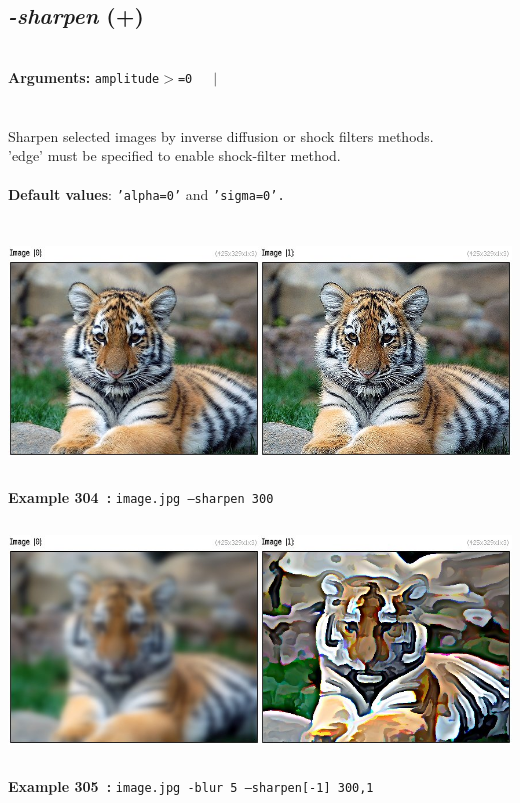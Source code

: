 \documentclass[a4paper,11pt,twoside]{book}
\begin{document}
\subsection{\emph{-sharpen} (+)}\vspace*{-0.5em}
~\\\textbf{Arguments: } 
{\small \texttt{amplitude$>$=0}}~~~$|$\\
\\~\\
Sharpen selected images by inverse diffusion or shock filters methods.
~\\'edge' must be specified to enable shock-filter method.
~\\~\\\textbf{Default values}: {\small \texttt{'alpha=0'} and \texttt{'sigma=0'.}}
\begin{center}\includegraphics[keepaspectratio=true,height=7cm,width=\textwidth]{img/gmic_def304.jpg}\\
{\footnotesize \textbf{Example 304~:} \texttt{image.jpg --sharpen 300}}
\\\includegraphics[keepaspectratio=true,height=7cm,width=\textwidth]{img/gmic_def305.jpg}\\
{\footnotesize \textbf{Example 305~:} \texttt{image.jpg -blur 5 --sharpen[-1] 300,1}}
\end{center}
\end{document}
